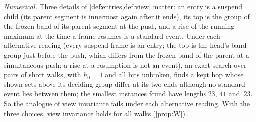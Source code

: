 \begin{remark}\label{rem:fixes}
\emph{Numerical.} Three details of \cref{def:entries,def:view} matter: an entry is a suspend child (its parent segment is
innermost again after it ends), its top is the group of the frozen band of its parent segment at the push, and a rise of the
running maximum at the time a frame resumes is a standard event. Under each alternative reading (every suspend frame is an
entry; the top is the head's band group just before the push, which differs from the frozen band of the parent at a
simultaneous push; a rise at a resumption is not an event), an exact search over pairs of short walks, with $h_0=1$ and all
bits unbroken, finds a kept hop whose shown sets above its deciding group differ at its two ends although no standard event
lies between them; the smallest instances found have lengths $23$, $41$ and~$23$. So the analogue of view invariance fails
under each alternative reading. With the three choices, view invariance holds for all walks (\cref{prop:W}).
\end{remark}
